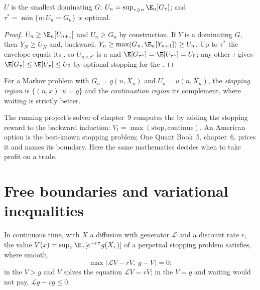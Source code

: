 \begin{theorem}\label{thm:qm:optimal-stopping-and-impulse-control:snell}
$U$ is the smallest  dominating $G$; $U_n = \sup_{\tau \ge n}\E_n[G_\tau]$; and $\tau^* = \min\{n : U_n = G_n\}$ is
optimal.
\end{theorem}

\begin{proof}
$U_n \ge \E_n[U_{n+1}]$ and $U_n \ge G_n$ by construction. If $Y$ is a  dominating $G$, then $Y_N \ge
U_N$ and, backward, $Y_n \ge \max(G_n, \E_n[Y_{n+1}]) \ge U_n$. Up to $\tau^*$ the envelope equals its , so $U_{n\wedge\tau^*}$ is a  and $\E[G_{\tau^*}] = \E[U_{\tau^*}] = U_0$; any other $\tau$ gives $\E[G_\tau] \le
\E[U_\tau] \le U_0$ by optional stopping for the .
\end{proof}

\begin{definition}\label{def:qm:optimal-stopping-and-impulse-control:regions}
For a Markov problem with $G_n = g(n, X_n)$ and $U_n = u(n, X_n)$, the \emph{stopping region} is
$\{(n, x) : u = g\}$ and the \emph{continuation region} its complement, where waiting is
strictly better.
\end{definition}

The running project's solver of chapter~9 computes the  by adding the stopping reward to the
backward induction: $V_t = \max(\text{stop}, \text{continue})$. An American option is the best-known stopping
problem; One Quant Book~5, chapter~6, prices it and names its boundary. Here the same mathematics decides
when to take profit on a trade.

\section{Free boundaries and variational inequalities}

In continuous time, with $X$ a diffusion with generator $\mathcal L$ and a discount rate $r$, the value $V(x) =
\sup_\tau\E_x[e^{-r\tau}g(X_\tau)]$ of a perpetual stopping problem satisfies, where smooth,
\[
\max\bigl(\mathcal LV - rV,\ g - V\bigr) = 0:
\]
in the  $V > g$ and $V$ solves the equation $\mathcal LV = rV$; in the  $V = g$ and
waiting would not pay, $\mathcal Lg - rg \le 0$.

